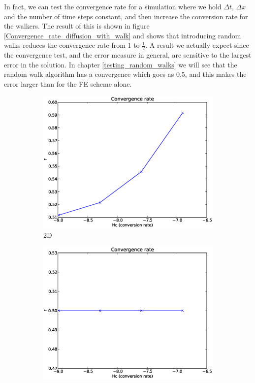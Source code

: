 In fact, we can test the convergence rate for a simulation where we hold $\Delta t$, $\Delta x$ and the number of time steps constant, and then increase the conversion rate for the walkers. 
The result of this is shown in figure \ref{Convergence_rate_diffusion_with_walk} and shows that introducing random walks reduces the convergence rate from 1 to $\frac{1}{2}$. 
A result we actually expect since the convergence test, and the error measure in general, are sensitive to the largest error in the solution. 
In chapter \ref{testing_random_walks} we will see that the random walk algorithm has a convergence which goes as $0.5$, and this makes the error larger than for the FE scheme alone. 

\begin{figure}[H]
 \centering
 \begin{subfigure}[b]{0.48\textwidth}
 \includegraphics[width=\textwidth]{../doc/results/experiment_04122013_1259_convergenceTest_combinedSimulation_2d/results/ConvergenceTest.eps}
  \caption{2D}
  \label{Convergence_rate_diffusion_with_walk:2d}
 \end{subfigure}
 \begin{subfigure}[b]{0.48\textwidth}
 \includegraphics[width=\textwidth]{../doc/results/experiment_05122013_1037_ConvergenceTest_CombinedSimulation_1d/results/ConvergenceTest.eps}

\end{subfigure}
\end{figure}
